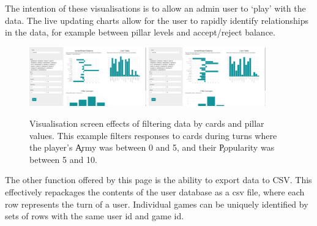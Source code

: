 The intention of these visualisations is to allow an admin user to `play' with the data. The live updating charts allow for the user to rapidly identify relationships in the data, for example between pillar levels and accept/reject balance.

\begin{figure}[!h]
	\centering
	\includegraphics[width=0.45\textwidth]{./images/design/visualisation.png}
	\includegraphics[width=0.45\textwidth]{./images/design/visualisation_filter.png}
	\caption{Visualisation screen effects of filtering data by cards and pillar values. This example filters responses to cards during turns where the player's \c{Army} was between 0 and 5, and their \c{Popularity} was between 5 and 10.}
	\label{fig:visualisation}
\end{figure}

The other function offered by this page is the ability to export data to CSV. This effectively repackages the contents of the user database as a csv file, where each row represents the turn of a user. Individual games can be uniquely identified by sets of rows with the same user id and game id.